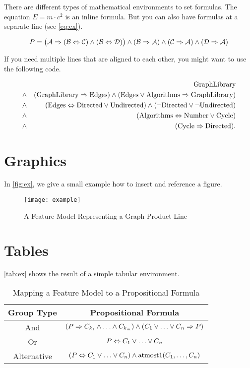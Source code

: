 There are different types of mathematical environments to set formulas. The equation $E=m\cdot c^2$ is an inline formula. But you can also have formulas at a separate line (see \vref{eq:ex}).

	\begin{equation}\label{eq:ex}
			P=\bigl(\mathcal{A}\Rightarrow(\mathcal{B}\Leftrightarrow\mathcal{C})\wedge(\mathcal{B}\Leftrightarrow\mathcal{D})\bigr)\wedge(\mathcal{B}\Rightarrow\mathcal{A})\wedge(\mathcal{C}\Rightarrow\mathcal{A})\wedge(\mathcal{D}\Rightarrow\mathcal{A})
	\end{equation}

If you need multiple lines that are aligned to each other, you might want to use the following code.

	\newcommand{\fG}{\mbox{GraphLibrary}}
	\newcommand{\fE}{\mbox{Edges}}
	\newcommand{\fA}{\mbox{Algorithms}}
	\newcommand{\fD}{\mbox{Directed}}
	\newcommand{\fU}{\mbox{Undirected}}
	\newcommand{\fN}{\mbox{Number}}
	\newcommand{\fC}{\mbox{Cycle}}
	\begin{eqnarray*}
	&& \fG\\
	&\pand& (\fG \pimplies \fE) \pand (\fE \por \fA \pimplies \fG)\\
	&\pand& (\fE \pequals \fD \por \fU) \pand (\pnot \fD \por \pnot \fU)\\
	&\pand& (\fA \pequals \fN \por \fC)\\
	&\pand& (\fC \pimplies \fD).\\
	\end{eqnarray*}

\section{Graphics}

In \vref{fig:ex}, we give a small example how to insert and reference a figure.

\begin{figure}[htbp]
	\centering
		\texttt{[image: example]}
	\caption{A Feature Model Representing a Graph Product Line}
	\label{fig:ex}
\end{figure}

\section{Tables}

\vref{tab:ex} shows the result of a simple tabular environment.

\begin{table}[htbp]
	\centering
		\begin{tabular}{cc}\toprule
			Group Type & Propositional Formula\\\midrule
			And & $(P \Rightarrow C_{k_1} \wedge\ldots\wedge C_{k_m}) \wedge (C_1\vee\ldots\vee C_n \Rightarrow P)$\\\addlinespace
			Or & $P \Leftrightarrow C_1\vee\ldots\vee C_n$\\\addlinespace
			Alternative & $(P \Leftrightarrow C_1\vee\ldots\vee C_n) \wedge \mbox{atmost}1(C_1,\ldots,C_n)$\\
			\bottomrule
		\end{tabular}
	\caption{Mapping a Feature Model to a Propositional Formula}
	\label{tab:ex}
\end{table}

